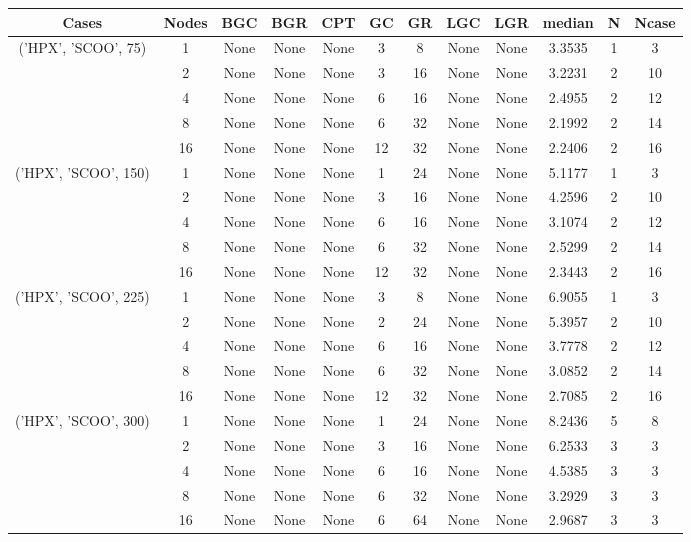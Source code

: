 \begin{tabular}{cccccccccccc}
\hline
Cases & Nodes& BGC& BGR& CPT& GC& GR& LGC& LGR& median & N & Ncase \\
\hline
\multirow{5}{*}{('HPX', 'SCOO', 75)}& 1& None& None& None& 3& 8& None& None& 3.3535& 1& 3\\
& 2& None& None& None& 3& 16& None& None& 3.2231& 2& 10\\
& 4& None& None& None& 6& 16& None& None& 2.4955& 2& 12\\
& 8& None& None& None& 6& 32& None& None& 2.1992& 2& 14\\
& 16& None& None& None& 12& 32& None& None& 2.2406& 2& 16\\
\hline
\multirow{5}{*}{('HPX', 'SCOO', 150)}& 1& None& None& None& 1& 24& None& None& 5.1177& 1& 3\\
& 2& None& None& None& 3& 16& None& None& 4.2596& 2& 10\\
& 4& None& None& None& 6& 16& None& None& 3.1074& 2& 12\\
& 8& None& None& None& 6& 32& None& None& 2.5299& 2& 14\\
& 16& None& None& None& 12& 32& None& None& 2.3443& 2& 16\\
\hline
\multirow{5}{*}{('HPX', 'SCOO', 225)}& 1& None& None& None& 3& 8& None& None& 6.9055& 1& 3\\
& 2& None& None& None& 2& 24& None& None& 5.3957& 2& 10\\
& 4& None& None& None& 6& 16& None& None& 3.7778& 2& 12\\
& 8& None& None& None& 6& 32& None& None& 3.0852& 2& 14\\
& 16& None& None& None& 12& 32& None& None& 2.7085& 2& 16\\
\hline
\multirow{5}{*}{('HPX', 'SCOO', 300)}& 1& None& None& None& 1& 24& None& None& 8.2436& 5& 8\\
& 2& None& None& None& 3& 16& None& None& 6.2533& 3& 3\\
& 4& None& None& None& 6& 16& None& None& 4.5385& 3& 3\\
& 8& None& None& None& 6& 32& None& None& 3.2929& 3& 3\\
& 16& None& None& None& 6& 64& None& None& 2.9687& 3& 3\\
\hline
\end{tabular}



